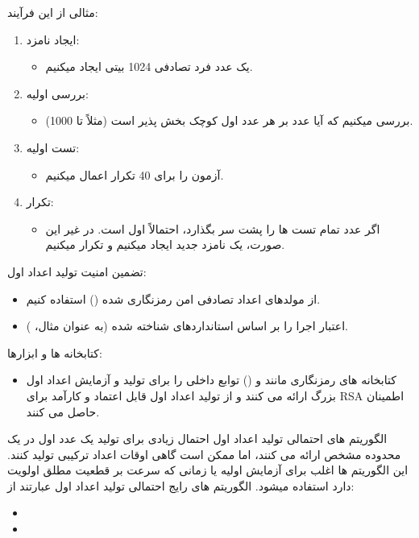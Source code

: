 \documentclass{report}
\begin{document}
مثالی از این فرآیند:
\begin{enumerate}
    \item
    ایجاد نامزد:
    \begin{itemize}
        \item 
        یک عدد فرد تصادفی 1024 بیتی ایجاد میکنیم.
    \end{itemize}

    \item
    بررسی اولیه:
    \begin{itemize}
        \item 
        بررسی میکنیم که آیا عدد بر هر عدد اول کوچک بخش پذیر است (مثلاً تا 1000).
    \end{itemize}

    \item
    تست اولیه:
    \begin{itemize}
        \item 
        آزمون  را برای 40 تکرار اعمال میکنیم.
    \end{itemize}

    \item
    تکرار:
    \begin{itemize}
        \item 
        اگر عدد تمام تست ها را پشت سر بگذارد، احتمالاً اول است. در غیر این صورت، یک نامزد جدید ایجاد میکنیم و تکرار میکنیم.
    \end{itemize}
\end{enumerate}

تضمین امنیت تولید اعداد اول:
\begin{itemize}
    \item 
    از مولدهای اعداد تصادفی امن رمزنگاری شده () استفاده کنیم.
    
    \item
    اعتبار اجرا را بر اساس استانداردهای شناخته شده (به عنوان مثال، ).
\end{itemize}

کتابخانه ها و ابزارها:
\begin{itemize}
    \item 
    کتابخانه های رمزنگاری مانند  و  () توابع داخلی را برای تولید و آزمایش اعداد اول بزرگ ارائه می کنند و از تولید اعداد اول قابل اعتماد و کارآمد برای RSA اطمینان حاصل می کنند.
\end{itemize}

الگوریتم های احتمالی تولید اعداد اول احتمال زیادی برای تولید یک عدد اول در یک محدوده مشخص ارائه می کنند، اما ممکن است گاهی اوقات اعداد ترکیبی تولید کنند. این الگوریتم ها اغلب برای آزمایش اولیه یا زمانی که سرعت بر قطعیت مطلق اولویت دارد استفاده میشود.
الگوریتم های رایج احتمالی تولید اعداد اول عبارتند از:
\begin{itemize}
    \item {}
    \item {}
\end{itemize}
\end{document}
